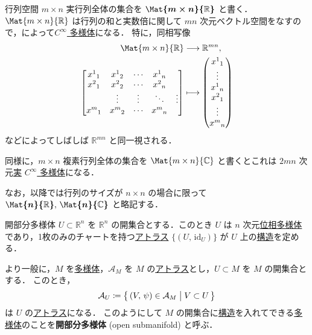 \documentclass[geometry_main]{subfiles}
\begin{document}
\begin{myexample}[label=ex:diffmani-finmat]{行列空間}
	$m \times n$ 実行列全体の集合を $\bm{\Mat{m \times n}{\mathbb{R}}}$ と書く．$\Mat{m \times n}{\mathbb{R}}$ は行列の和と実数倍に関して $mn$ 次元ベクトル空間をなすので，によって\hyperref[diffmani]{$C^\infty$ 多様体}になる．
	特に，同相写像
	\begin{align}
		\Mat{m \times n}{\mathbb{R}} &\lto \mathbb{R}^{mn},\\ 
		\mqty[x^1{}_1 &x^1{}_2& \cdots &x^1{}_n \\ x^2{}_1 &x^2{}_2 &\cdots &x^2{}_n \\ &\vdots & \vdots &\ddots &\vdots \\ x^m{}_1 &x^m{}_2 &\cdots &x^m{}_n] &\lmto \mqty(x^1{}_1 \\ \vdots \\ x^1{}_n \\ x^2{}_1\\ \vdots \\ x^m{}_n )
	\end{align}
	などによってしばしば $\mathbb{R}^{mn}$ と同一視される．
	
	同様に，$m \times n$ 複素行列全体の集合を $\Mat{m \times n}{\mathbb{C}}$ と書くとこれは $2mn$ 次元\underline{実} \hyperref[diffmani]{$C^\infty$ 多様体}になる．

	なお，以降では行列のサイズが $n \times n$ の場合に限って $\bm{\Mat{n}{\mathbb{R}}},\, \bm{\Mat{n}{\mathbb{C}}}$ と略記する．
\end{myexample}

\begin{myexample}[label=ex:open-submani]{開部分多様体}
	$U \subset \mathbb{R}^n$ を $\mathbb{R}^n$ の開集合とする．このとき $U$ は $n$ 次元\hyperref[def.topomani]{位相多様体}であり，1枚のみのチャートを持つ\hyperref[def.atlas]{アトラス} $\{(U,\, \mathrm{id}_U)\}$ が $U$ 上の\hyperref[diffmani]{\cinfty 構造}を定める．

	より一般に，$M$ を\hyperref[diffmani]{\cinfty 多様体}，$\mathcal{A}_M$ を $M$ の\hyperref[diffmani]{\cinfty アトラス}とし，$U\subset M$ を $M$ の開集合とする．
	このとき，
	\begin{align}
		\mathcal{A}_U \coloneqq \bigl\{\, (V,\, \psi) \in \mathcal{A}_M \bigm| V \subset U \,\bigr\} 
	\end{align}
	は $U$ の\hyperref[def.atlas]{\cinfty アトラス}になる．
	このようにして $M$ の開集合に\hyperref[diffmani]{\cinfty 構造}を入れてできる\hyperref[diffmani]{\cinfty 多様体}のことを\textbf{開部分多様体} (open submanifold) と呼ぶ．
\end{myexample}
\end{document}
